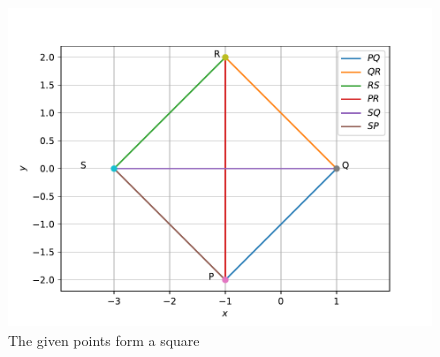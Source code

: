 \documentclass[journal,12pt,twocolumn]{IEEEtran}
\renewcommand\thesection{\arabic{section}}
\begin{document}
\begin{enumerate}[label=\thesection.\arabic*.,ref=\thesection.\theenumi]
\begin{figure}[!ht]
	\centering
	\includegraphics[width=\columnwidth]{quad1.pdf}
	\caption{The given points form a square}
	\label{fig:3.5.4_quadrilateral1}
\end{figure}


\end{enumerate}
\end{document}
